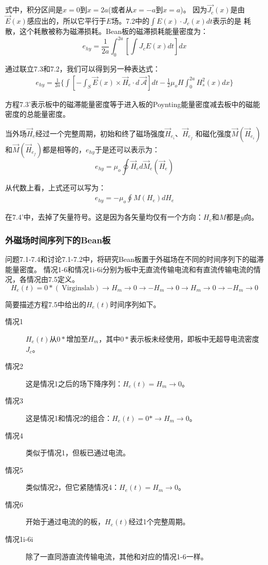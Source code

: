 式中，积分区间是$x=0$到$x=2a$(或者从$x=-a$到$x=a$)。
因为$\vec{J_c}(x)$是由$\vec{E}(x)$感应出的，所以它平行于$E$场。7.2中的$\int E(x)\cdot J_c(x)dt$表示的是
耗散，这个耗散被称为磁滞损耗。Bean板的磁滞损耗能量密度为：
\begin{equation}%
e_{hy}=\frac{1}{2a}\int_{0}^{2a}\left[\int J_cE(x)dt\right]dx
\end{equation}

通过联立7.3和7.2，我们可以得到另一种表达式：
\begin{align*}%
e_{hy}=\frac{1}{2a}\{\int\left[-\int_{S}\vec{E}(x)\times\vec{H}_e\cdot d\vec{\ \mathcal{A}}\right]dt-\frac{1}{2}\mu_oH\int_{0}^{2a}H_{s}^{2}(x)dx\} \tag{7.3'}
\end{align*}

方程7.3’表示板中的磁滞能量密度等于进入板的Poynting能量密度减去板中的磁能密度的总能量密度。

当外场$\vec{H}_e$经过一个完整周期，初始和终了磁场强度$\vec{H}_{e_i}$、$\vec{H}_{e_f}$
和磁化强度$\vec{M}(\vec{H}_{e_i})$和$\vec{M}(\vec{H}_{e_f})$都是相等的，$e_{hy}$于是还可以表示为：
\begin{equation}%
e_{hy}=\mu_o\oint\vec{H}_ed\vec{M}_e(\vec{H}_e)
\end{equation}

从代数上看，上式还可以写为：
\begin{align*}%
e_{hy}=-\mu_o\oint M(H_e)dH_e \tag{7.4'}
\end{align*}

在7.4’中，去掉了矢量符号。这是因为各矢量均仅有一个方向：$H_e$和$M$都是$y$向。

\subsubsection*{外磁场时间序列下的Bean板}
问题7.1-7.4和讨论7.1-7.2中，将研究Bean板置于外磁场在不同的时间序列下的磁滞能量密度。
情况1-6和情况1i-6i分别为板中无直流传输电流和有直流传输电流的情况，各情况由7.5定义。
\begin{equation}%
H_e(t)=0*(\ \mathrm{Virgin slab})\rightarrow H_m\rightarrow 0\rightarrow -H_m\rightarrow 0\rightarrow H_m\rightarrow 0\rightarrow -H_m\rightarrow 0
\end{equation}

简要描述方程7.5中给出的$H_e(t)$时间序列如下。
\begin{description}
	\item[情况1] $H_e(t)$从$0*$增加至$H_m$，其中$0*$表示板未经使用，即板中无超导电流密度$J_c$。
	\item[情况2] 这是情况1之后的场下降序列：$H_e(t)=H_m\rightarrow 0$。
	\item[情况3] 这是情况1和情况2的组合：$H_e(t)=0*\rightarrow H_m\rightarrow 0$。
	\item[情况4] 类似于情况1，但板已通过电流。
	\item[情况5] 类似情况2，但它紧随情况4：$H_e(t)=H_m\rightarrow 0$。
	\item[情况6] 开始于通过电流的的板，$H_e(t)$经过1个完整周期。
	\item[情况1i-6i] 除了一直同游直流传输电流，其他和对应的情况1-6一样。
\end{description}

